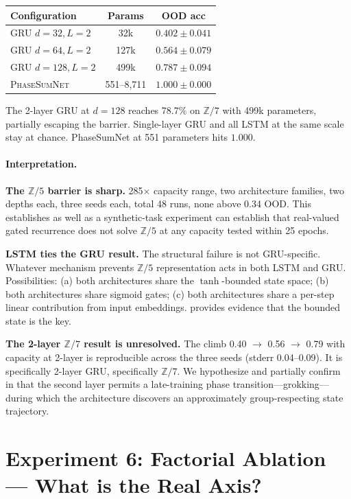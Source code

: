 \documentclass[11pt]{article}
\theoremstyle{definition}
\newcommand{\Z}{\mathbb{Z}}
\begin{document}
\begin{center}
\begin{tabular}{lcc}
\toprule
Configuration & Params & OOD acc \\
\midrule
GRU $d=32, L=2$  & 32k  & $0.402 \pm 0.041$ \\
GRU $d=64, L=2$  & 127k & $0.564 \pm 0.079$ \\
GRU $d=128, L=2$ & 499k & $0.787 \pm 0.094$ \\
\textsc{PhaseSumNet} & 551--8{,}711 & $\mathbf{1.000 \pm 0.000}$ \\
\bottomrule
\end{tabular}
\end{center}

The 2-layer GRU at $d=128$ reaches 78.7\% on $\Z/7$ with 499k
parameters, partially escaping the barrier. Single-layer GRU and
all LSTM at the same scale stay at chance. PhaseSumNet at 551
parameters hits $1.000$.

\paragraph{Interpretation.}

\textbf{The $\Z/5$ barrier is sharp.} 285$\times$ capacity range,
two architecture families, two depths each, three seeds each, total
48 runs, none above 0.34 OOD. This establishes as well as a
synthetic-task experiment can establish that real-valued gated
recurrence does not solve $\Z/5$ at any capacity tested within 25
epochs.

\textbf{LSTM ties the GRU result.} The structural failure is not
GRU-specific. Whatever mechanism prevents $\Z/5$ representation
acts in both LSTM and GRU. Possibilities: (a) both architectures
share the $\tanh$-bounded state space; (b) both architectures share
sigmoid gates; (c) both architectures share a per-step linear
contribution from input embeddings.  provides
evidence that the bounded state is the key.

\textbf{The 2-layer $\Z/7$ result is unresolved.} The climb 0.40
$\to$ 0.56 $\to$ 0.79 with capacity at 2-layer is reproducible
across the three seeds (stderr 0.04--0.09). It is specifically
2-layer GRU, specifically $\Z/7$. We hypothesize and partially
confirm in  that the second layer permits a
late-training phase transition---grokking---during which the
architecture discovers an approximately group-respecting state
trajectory.


\section{Experiment 6: Factorial Ablation --- What is the Real Axis?}
\label{sec:exp6}
\end{document}
